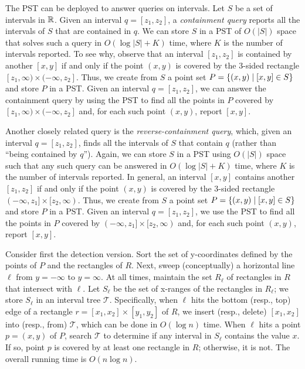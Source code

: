 \documentclass[acmsmall,review,anonymous]{acmart}
\def\vgap{\vspace{1mm}}
\def\extraspacing{\vspace{2mm} \noindent}
\def\T{\mathcal{T}}
\begin{document}
{{{\vgap

The PST can be deployed to answer queries on intervals. Let $S$ be a set of intervals in $\mathbb{R}$. Given an interval $q = [z_1, z_2]$, a {\em containment query} reports all the intervals of $S$ that are contained in $q$. We can store $S$ in a PST of $O(|S|)$ space that solves such a query in $O(\log |S| + K)$ time, where $K$ is the number of intervals reported. To see why, observe that an interval $[z_1, z_2]$ is contained by another $[x, y]$ if and only if the point $(x, y)$ is covered by the 3-sided rectangle $[z_1, \infty) \times (-\infty, z_2]$. Thus, we create from $S$ a point set $P = \{(x, y) \mid [x, y] \in S\}$ and store $P$ in a PST. Given an interval $q = [z_1, z_2]$, we can answer the containment query by using the PST to find all the points in $P$ covered by $[z_1, \infty) \times (-\infty, z_2]$ and, for each such point $(x, y)$, report $[x, y]$.

\vgap

Another closely related query is the {\em reverse-containment query}, which, given an interval $q = [z_1, z_2]$, finds all the intervals of $S$ that contain $q$ (rather than ``being contained by $q$''). Again, we can store $S$ in a PST using $O(|S|)$ space such that any such query can be answered in $O(\log |S| + K)$ time, where $K$ is the number of intervals reported. In general, an interval $[x, y]$ contains another $[z_1, z_2]$ if and only if the point $(x, y)$ is covered by the 3-sided rectangle $(-\infty, z_1] \times [z_2, \infty)$. Thus, we create from $S$ a point set $P = \{(x, y) \mid [x, y] \in S\}$ and store $P$ in a PST. Given an interval $q = [z_1, z_2]$, we use the PST to find all the points in $P$ covered by $(-\infty, z_1] \times [z_2, \infty)$ and, for each such point $(x, y)$, report $[x, y]$.

\extraspacing {\bf Algorithm for Problem $\bm{\mathscr{A}}$.} Consider first the detection version. Sort the set of y-coordinates defined by the points of $P$ and the rectangles of $R$. Next, sweep (conceptually) a horizontal line $\ell$ from $y = -\infty$ to $y = \infty$. At all times, maintain the set $R_\ell$ of rectangles in $R$ that intersect with $\ell$. Let $S_\ell$ be the set of x-ranges of the rectangles in $R_\ell$; we store $S_\ell$ in an interval tree $\T$. Specifically, when $\ell$ hits the bottom (resp., top) edge of a rectangle $r = [x_1, x_2] \times [y_1, y_2]$ of $R$, we insert (resp., delete) $[x_1, x_2]$ into (resp., from) $\T$, which can be done in $O(\log n)$ time. When $\ell$ hits a point $p = (x, y)$ of $P$, search $\T$ to determine if any interval in $S_\ell$ contains the value $x$. If so, point $p$ is covered by at least one rectangle in $R$; otherwise, it is not. The overall running time is $O(n \log n)$.

}}}
\end{document}
